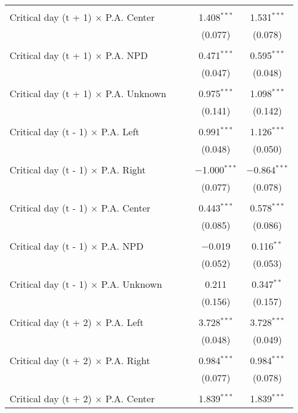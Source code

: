 \documentclass[
]{article}
\begin{document}
\begin{table}[!htbp]
{\begin{tabular}{@{\extracolsep{5pt}}lcccc}
  & & & & \\ 
 Critical day (t + 1) $\times$ P.A. Center &  &  & 1.408$^{***}$ & 1.531$^{***}$ \\ 
  &  &  & (0.077) & (0.078) \\ 
  & & & & \\ 
 Critical day (t + 1) $\times$ P.A. NPD &  &  & 0.471$^{***}$ & 0.595$^{***}$ \\ 
  &  &  & (0.047) & (0.048) \\ 
  & & & & \\ 
 Critical day (t + 1) $\times$ P.A. Unknown &  &  & 0.975$^{***}$ & 1.098$^{***}$ \\ 
  &  &  & (0.141) & (0.142) \\ 
  & & & & \\ 
 Critical day (t - 1) $\times$ P.A. Left &  &  & 0.991$^{***}$ & 1.126$^{***}$ \\ 
  &  &  & (0.048) & (0.050) \\ 
  & & & & \\ 
 Critical day (t - 1) $\times$ P.A. Right &  &  & $-$1.000$^{***}$ & $-$0.864$^{***}$ \\ 
  &  &  & (0.077) & (0.078) \\ 
  & & & & \\ 
 Critical day (t - 1) $\times$ P.A. Center &  &  & 0.443$^{***}$ & 0.578$^{***}$ \\ 
  &  &  & (0.085) & (0.086) \\ 
  & & & & \\ 
 Critical day (t - 1) $\times$ P.A. NPD &  &  & $-$0.019 & 0.116$^{**}$ \\ 
  &  &  & (0.052) & (0.053) \\ 
  & & & & \\ 
 Critical day (t - 1) $\times$ P.A. Unknown &  &  & 0.211 & 0.347$^{**}$ \\ 
  &  &  & (0.156) & (0.157) \\ 
  & & & & \\ 
 Critical day (t + 2) $\times$ P.A. Left &  &  & 3.728$^{***}$ & 3.728$^{***}$ \\ 
  &  &  & (0.048) & (0.049) \\ 
  & & & & \\ 
 Critical day (t + 2) $\times$ P.A. Right &  &  & 0.984$^{***}$ & 0.984$^{***}$ \\ 
  &  &  & (0.077) & (0.078) \\ 
  & & & & \\ 
 Critical day (t + 2) $\times$ P.A. Center &  &  & 1.839$^{***}$ & 1.839$^{***}$ \\ 

\end{tabular}}
\end{table}
\end{document}
